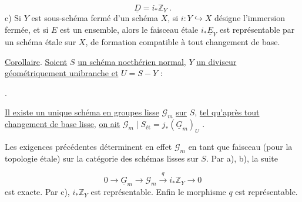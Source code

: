 \begin{equation*}
\underline{D} = i_* \mathbb{Z}_Y \ .
\end{equation*}
c) Si $Y$ est sous-schéma fermé d'un schéma $X$, si $i:Y\hookrightarrow X$ désigne l'immersion fermée, et si $E$ est un ensemble, alors le faisceau étale $i_* \underline{E}_Y$ est représentable par un schéma étale sur $X$, de formation compatible à tout changement de base.

\underline{Corollaire}. \underline{Soient} $S$ \underline{un schéma noethérien normal}, $Y$ \underline{un diviseur géométriquement unibranche et} $U = S-Y$ :

\begin{center}
\quad .
\end{center}
\underline{Il existe un unique schéma en groupes lisse} $\mathcal{G}_m$ \underline{sur} $S$, \underline{tel qu'après tout changement de base lisse}, \underline{on ait} $\mathcal{G}_m \mid S_{\text{\'et}} = j_*(\underline{G}_m)_U$ .

Les exigences précédentes déterminent en effet $\mathcal{G}_m$ en tant que faisceau (pour la topologie étale) sur la catégorie des schémas lisses sur $S$. Par a), b), la suite

\begin{equation*}
0 \longrightarrow \underline{G}_m \longrightarrow \mathcal{G}_m \xrightarrow{\ q\ } i_* \mathbb{Z}_Y \longrightarrow 0
\end{equation*}
est exacte. Par c), $i_* \mathbb{Z}_Y$ est représentable. Enfin le morphisme $q$ est représentable.

